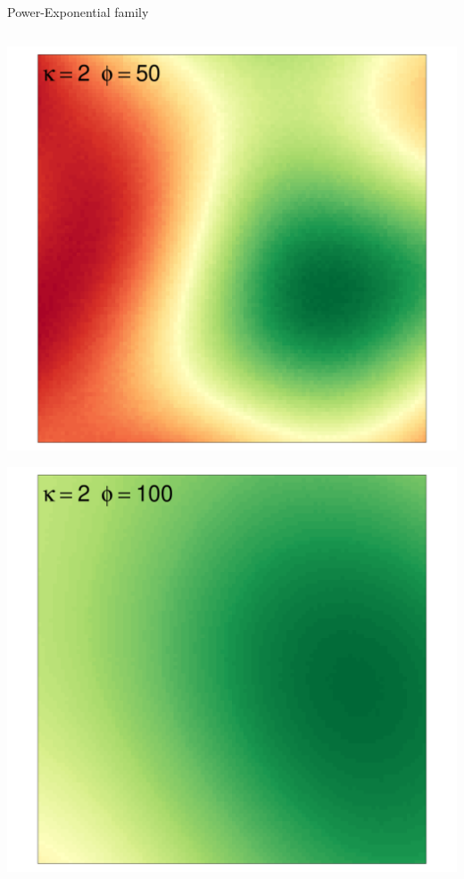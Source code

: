 \documentclass[
  ignorenonframetext,
]{beamer}
\begin{document}
\begin{frame}{Power-Exponential family}
\begin{columns}[T]
\begin{column}{0.33\textwidth}
\includegraphics{Lecture_1_files/figure-beamer/unnamed-chunk-21-1.pdf}

\includegraphics{Lecture_1_files/figure-beamer/unnamed-chunk-22-1.pdf}
\end{column}
\end{columns}
\end{frame}
\end{document}
